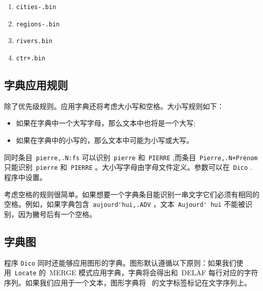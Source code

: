 \begin{enumerate}
  \item \verb$cities-.bin$
  \item \verb$regions-.bin$
  \item \verb$rivers.bin$
  \item \verb$ctr+.bin$
\end{enumerate}

\subsection{字典应用规则}
\label{section-transducer-application-rules}

除了优先级规则。应用字典还将考虑大小写和空格。大小写规则如下：


\begin{itemize}
  \item 如果在字典中一个大写字母，那么文本中也将是一个大写;

  \item 如果在字典中的小写的，那么文本中可能为小写或大写。

\end{itemize}

\noindent 
同时条目\ \verb$pierre,.N:fs$ 可以识别\ \verb+pierre+ 和\ \verb+PIERRE+ ,而条目\ \noindent \verb$Pierre,.N+Prénom$ 只能识别\ \verb+pierre+ 和\ \verb+PIERRE+ 。大小写字母由字母文件定义。参数可以在\ \verb+Dico+ . 程序中设置。


\bigskip
\noindent 
考虑空格的规则很简单。如果想要一个字典条目能识别一串文字它们必须有相同的空格。例如，如果字典包含\ \verb+aujourd'hui,.ADV+ ，文本\ \verb+Aujourd' hui+ 不能被识别，因为撇号后有一个空格。




\subsection{字典图}
\label{section-dictionary-graphs}
程序 \verb+Dico+ 同时还能够应用图形的字典。图形默认遵循以下原则：如果我们使用\ \verb+Locate+ 的\ MERGE 模式应用字典，字典将会得出和\ DELAF 每行对应的字符序列。如果我们应用于一个文本，图形字典将\  的文字标签标记在文字序列上。


